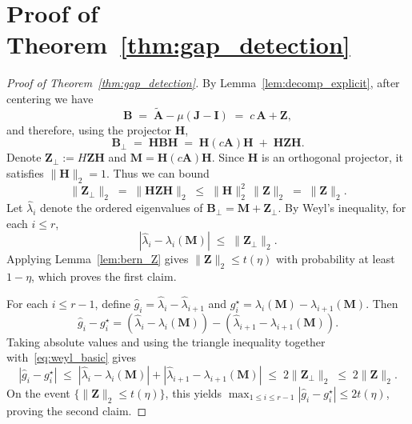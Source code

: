 \documentclass[11pt]{article}
\theoremstyle{plain}
\theoremstyle{definition}
\theoremstyle{remark}
\begin{document}








\section{Proof of Theorem~\ref{thm:gap_detection}}

\begin{proof}[Proof of Theorem~\ref{thm:gap_detection}]
By Lemma~\ref{lem:decomp_explicit}, after centering we have
$$
\mathbf B \;=\; \widetilde{\mathbf A}-\mu(\mathbf J-\mathbf I)
\;=\; c\,\mathbf A + \mathbf Z,
$$
and therefore, using the projector $\mathbf H$,
$$
\mathbf B_\perp
\;=\;
\mathbf H \mathbf B \mathbf H
\;=\;
\mathbf H(c\mathbf A)\mathbf H
\;+\;
\mathbf H \mathbf Z \mathbf H.
$$
Denote $\mathbf Z_\perp := H \mathbf Z \mathbf H$ and $\mathbf M = \mathbf H(c\mathbf A)\mathbf H$.
Since $\mathbf H$ is an orthogonal projector, it satisfies
$\|\mathbf H\|_2=1$. Thus we can bound
\begin{equation*}
\|\mathbf Z_\perp\|_2 \;=\; \|\mathbf H \mathbf Z \mathbf H\|_2 \;\le\; \|\mathbf H\|_2^2\,\|\mathbf Z\|_2 \;=\; \|\mathbf Z\|_2.
\end{equation*}
Let $\hat\lambda_i$ denote the ordered eigenvalues of $\mathbf B_\perp=\mathbf M+\mathbf Z_\perp$.
By Weyl's inequality, for each $i\le r$,
\begin{equation}
|\hat\lambda_i-\lambda_i(\mathbf M)| \;\le\; \|\mathbf Z_\perp\|_2.
\label{eq:weyl_basic}
\end{equation}
Applying Lemma~\ref{lem:bern_Z} gives $\|\mathbf Z\|_2\le t(\eta)$ with probability at least $1-\eta$,
which proves the first claim.

For each $i\le r-1$, define $\hat g_i=\hat\lambda_i-\hat\lambda_{i+1}$ and
$g_i^\star=\lambda_i(\mathbf M)-\lambda_{i+1}(\mathbf M)$. Then
$$
\hat g_i-g_i^\star
=
(\hat\lambda_i-\lambda_i(\mathbf M))-(\hat\lambda_{i+1}-\lambda_{i+1}(\mathbf M)).
$$
Taking absolute values and using the triangle inequality together with~\eqref{eq:weyl_basic} gives
$$
|\hat g_i-g_i^\star|
\;\le\;
|\hat\lambda_i-\lambda_i(\mathbf M)| + |\hat\lambda_{i+1}-\lambda_{i+1}(\mathbf M)|
\;\le\;
2\|\mathbf Z_\perp\|_2
\;\le\;
2\|\mathbf Z\|_2.
$$
On the event $\{\|\mathbf Z\|_2\le t(\eta)\}$, this yields
$\max_{1\le i\le r-1}|\hat g_i-g_i^\star|\le 2t(\eta)$, proving the second claim.


\end{proof}
\end{document}
